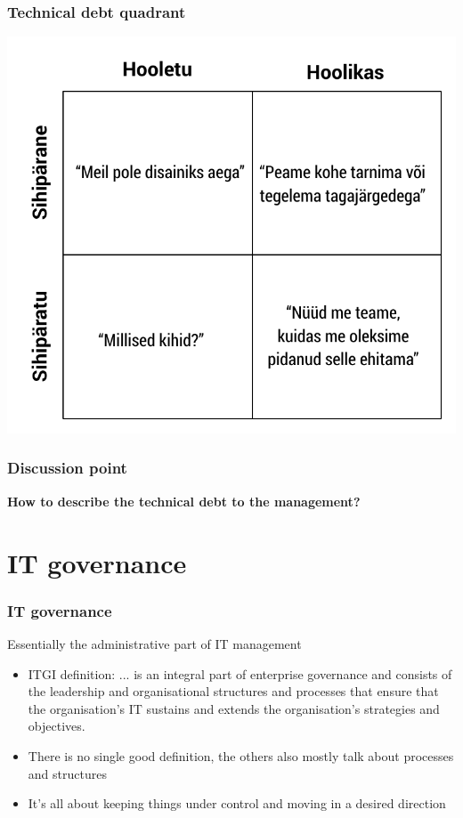 \begin{frame}[fragile]
  \frametitle{Technical debt quadrant}
  	\begin{center}
			\includegraphics[width=.65\textwidth]{fowler.pdf}
	\end{center}
	\cite{fowlerdebt}
\end{frame}

\begin{frame}[fragile]
  \frametitle{Discussion point}
		\begin{center}
			\textbf{How to describe the technical debt to the management?}
		\end{center}
\end{frame}

\section{IT governance}

\begin{frame}[fragile]
  \frametitle{IT governance}
  Essentially the administrative part of IT management
	\begin{itemize}
		\item ITGI definition: ... is an integral part of enterprise governance and consists of the leadership and organisational structures and processes that ensure that the organisation's IT sustains and extends the organisation's strategies and objectives. \citep{insitute2003board}
		\item There is no single good definition, the others also mostly talk about processes and structures
		\item It's all about keeping things under control and moving in a desired direction
	\end{itemize}
\end{frame}

